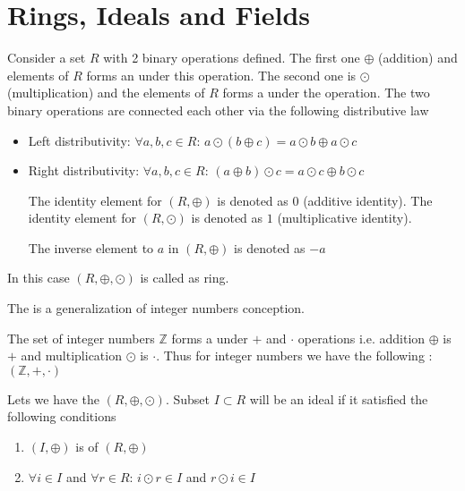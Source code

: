 \section{Rings, Ideals and Fields}

\begin{definition}[Ring]
  Consider a set $R$ with 2 binary operations defined. The first one
  $\oplus$ (addition) and elements of $R$ forms an
  under this operation. The second one is $\odot$ (multiplication) and
  the elements of $R$ forms a  under 
  the operation. The two binary operations are connected each other
  via the following distributive law
  \begin{itemize}
  \item Left distributivity:
    $\forall a,b,c \in R$:
    $a \odot \left(b \oplus c\right) =
    a \odot b \oplus a \odot c$
  \item Right distributivity:
    $\forall a,b,c \in R$:
    $\left( a \oplus b \right) \odot c =
    a \odot c \oplus b \odot c$
    
  The identity element for $\left(R, \oplus\right)$ is denoted as $0$
  (additive identity).
  The identity element for $\left(R, \odot\right)$ is denoted as $1$
  (multiplicative identity).

  The inverse element to $a$ in $\left(R, \oplus\right)$ is denoted as $-a$
  \end{itemize}

  In this case $\left(R, \oplus, \odot\right)$ is called as ring.
  \label{def:ring}
\end{definition}

The  is a generalization of integer numbers conception.
\begin{example}
  The set of integer numbers $\mathbb{Z}$ forms a 
  under $+$ and $\cdot$ operations i.e. addition $\oplus$ is
  $+$ and multiplication $\odot$ is $\cdot$. Thus for integer
  numbers we have the following :
  $\left(\mathbb{Z}, +, \cdot\right)$
  \label{ex:ring}
\end{example}

\begin{definition}[Ideal]
  Lets we have the 
  $\left(R, \oplus, \odot\right)$. Subset $I \subset R$ will be an
  ideal if it satisfied the following conditions
  \begin{enumerate}
  \item $\left(I, \oplus\right)$ is  of
    $\left(R, \oplus\right)$
  \item $\forall i \in I$ and $\forall r \in R$:
    $i \odot r \in I$ and $r \odot i \in I$
  \end{enumerate}
  \label{def:ideal}
\end{definition}

